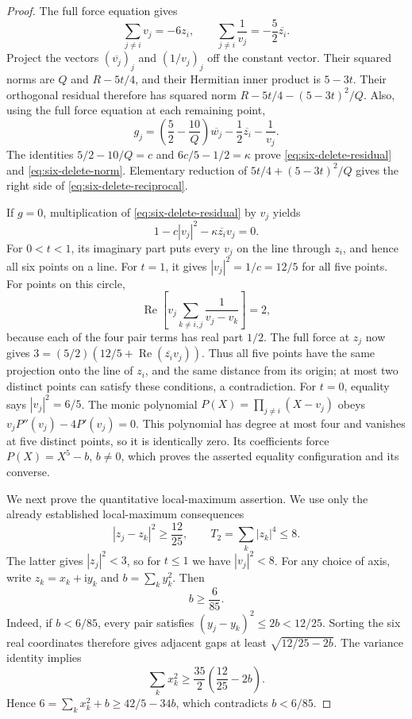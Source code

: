 \documentclass[11pt]{article}
\theoremstyle{remark}
\numberwithin{equation}{section}
\begin{document}
\begin{proof}
The full force equation gives
\[
 \sum_{j\ne i}v_j=-6z_i,\qquad
 \sum_{j\ne i}\frac1{v_j}=-\frac52\overline{z_i}.
\]
Project the vectors $(\overline{v_j})_j$ and $(1/v_j)_j$
off the constant vector. Their squared norms are $Q$ and
$R-5t/4$, and their Hermitian inner product is $5-3t$.
Their orthogonal residual therefore has squared norm
$R-5t/4-(5-3t)^2/Q$.
Also, using the full force equation at each remaining point,
\[
 g_j=\left(\frac52-\frac{10}{Q}\right)\overline{w_j}
                     -\frac12\overline{z_i}-\frac1{v_j}.
\]
The identities $5/2-10/Q=c$ and $6c/5-1/2=\kappa$
prove \eqref{eq:six-delete-residual} and
\eqref{eq:six-delete-norm}. Elementary reduction of
$5t/4+(5-3t)^2/Q$ gives the right side of
\eqref{eq:six-delete-reciprocal}.

If $g=0$, multiplication of \eqref{eq:six-delete-residual}
by $v_j$ yields
\[
       1-c|v_j|^2-\kappa\overline{z_i}v_j=0.
\]
For $0<t<1$, its imaginary part puts every $v_j$ on the line
through $z_i$, and hence all six points on a line.
For $t=1$, it gives $|v_j|^2=1/c=12/5$ for all five points.
For points on this circle,
\[
 \operatorname{Re}\!\left[
 v_j\sum_{k\ne i,j}\frac1{v_j-v_k}\right]=2,
\]
because each of the four pair terms has real part $1/2$.
The full force at $z_j$ now gives
$3=(5/2)(12/5+\operatorname{Re}(\overline{z_i}v_j))$.
Thus all five points have the same projection onto the line of
$z_i$, and the same distance from its origin; at most two distinct
points can satisfy these conditions, a contradiction.
For $t=0$, equality says $|v_j|^2=6/5$.
The monic polynomial $P(X)=\prod_{j\ne i}(X-v_j)$ obeys
$v_jP''(v_j)-4P'(v_j)=0$. This polynomial has degree at most
four and vanishes at five distinct points, so it is identically
zero. Its coefficients force $P(X)=X^5-b$, $b\ne0$,
which proves the asserted equality configuration and its converse.

We next prove the quantitative local-maximum assertion.
We use only the already established local-maximum consequences
\[
 |z_j-z_k|^2\ge\frac{12}{25},\qquad T_2=\sum_k|z_k|^4\le8.
\]
The latter gives $|z_j|^2<3$, so for $t\le1$ we have
$|v_j|^2<8$.
For any choice of axis, write $z_k=x_k+\mathrm i y_k$ and
$b=\sum_k y_k^2$. Then
\begin{equation}\label{eq:six-delete-strip}
                             b\ge\frac6{85}.
\end{equation}
Indeed, if $b<6/85$, every pair satisfies
$(y_j-y_k)^2\le2b<12/25$. Sorting the six real coordinates
therefore gives adjacent gaps at least
$\sqrt{12/25-2b}$. The variance identity implies
\[
 \sum_kx_k^2\ge\frac{35}{2}\left(\frac{12}{25}-2b\right).
\]
Hence $6=\sum_kx_k^2+b\ge42/5-34b$, which contradicts
$b<6/85$.


\end{proof}
\end{document}
